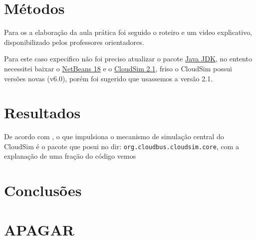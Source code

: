 \section{Métodos}
\par Para os a elaboração da aula prática foi seguido o roteiro e um video explicativo, disponibilizado pelos professores orientadores.
\par Para este caso expecifico não foi preciso atualizar o pacote \href{https://www.oracle.com/java/technologies/downloads/}{Java JDK}, no entento necessitei baixar o \href{https://netbeans.apache.org/download/nb19/}{NetBeans 18} e o \href{https://github.com/Cloudslab/cloudsim/releases}{CloudSim 2.1}, friso o CloudSim possui versões novas (v6.0), porém foi sugerido que usassemos a versão 2.1.



\section{Resultados}
\par De acordo com , o que impulsiona o mecanismo de simulação central do CloudSim é o pacote que posui no dir: \verb#org.cloudbus.cloudsim.core#, com a explanação de uma fração do código vemos

\section{Conclusões}


\section{APAGAR}


